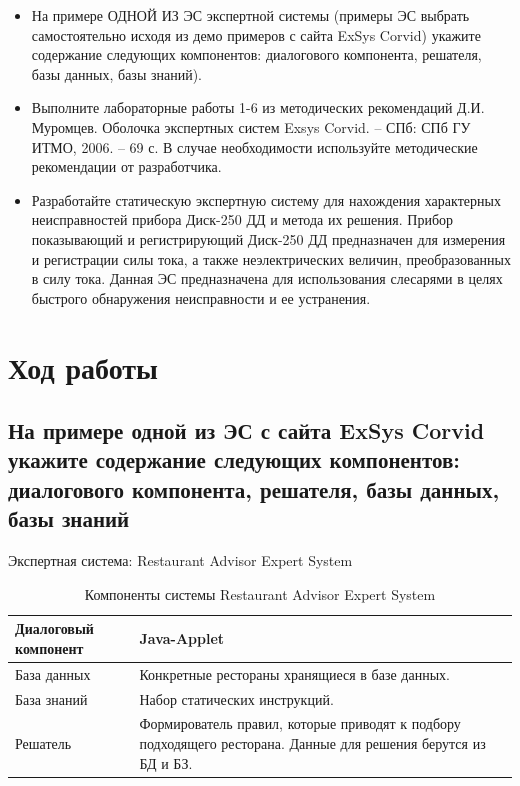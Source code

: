 \documentclass[14pt,a4paper,report]{report}
\begin{document}
\begin{itemize}
	\item На примере ОДНОЙ ИЗ ЭС экспертной системы (примеры ЭС выбрать самостоятельно исходя из демо примеров с сайта ExSys Corvid) укажите содержание следующих компонентов:  диалогового компонента, решателя, базы данных, базы знаний).
	\item Выполните лабораторные работы 1-6 из методических рекомендаций Д.И. Муромцев.
	Оболочка экспертных систем Exsys Corvid. – СПб: СПб ГУ ИТМО, 2006. – 69 с. В случае необходимости используйте методические рекомендации от разработчика.
	\item Разработайте статическую экспертную систему для нахождения характерных неисправностей прибора Диск-250 ДД и метода их решения. Прибор показывающий и регистрирующий Диск-250 ДД предназначен для измерения и регистрации силы тока, а также неэлектрических величин, преобразованных в силу тока. Данная ЭС предназначена для использования слесарями в целях быстрого обнаружения неисправности и ее устранения.
\end{itemize}

\clearpage

\section{Ход работы}

\subsection{На примере одной из ЭС с сайта ExSys Corvid укажите содержание следующих компонентов:  диалогового компонента, решателя, базы данных, базы знаний}

Экспертная система: Restaurant Advisor Expert System

\begin{table}[h!]
	\begin{tabular}{ | P{6cm} | P{10cm} | }
		\hline
		Диалоговый компонент & Java-Applet \\ \hline
		База данных & Конкретные рестораны хранящиеся в базе данных. \\ \hline
		База знаний & Набор статических инструкций. \\ \hline
		Решатель & Формирователь правил, которые приводят к подбору подходящего ресторана. Данные для решения берутся из БД и БЗ. \\ \hline
	\end{tabular}
	\caption{Компоненты системы Restaurant Advisor Expert System}
	\label{table:1}
\end{table}
\end{document}
